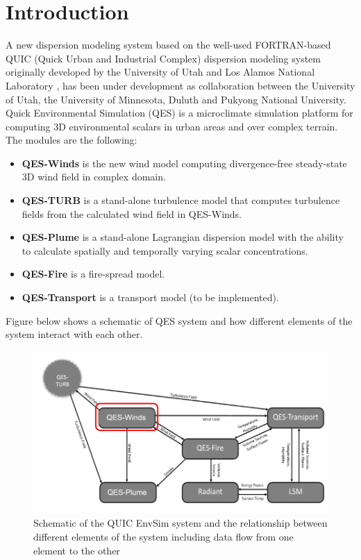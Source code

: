 \section{Introduction}

A new dispersion modeling system based on the well-used FORTRAN-based QUIC (Quick Urban and Industrial Complex) dispersion modeling system originally developed by the University of Utah and Los Alamos National Laboratory \cite{brown2013quic}, has been under development as collaboration between the University of Utah, the University of Minnesota, Duluth and Pukyong National University. Quick Environmental Simulation (QES) is a microclimate simulation platform for computing 3D environmental scalars in urban areas and over complex terrain.
The modules are the following:
\begin{itemize}
\item \textbf{QES-Winds} is the new wind model computing divergence-free steady-state 3D wind field in complex domain.
\item \textbf{QES-TURB} is a stand-alone turbulence model that computes turbulence fields from the calculated wind field in QES-Winds.
\item \textbf{QES-Plume} is a stand-alone Lagrangian dispersion model with the ability to calculate spatially and temporally varying scalar concentrations.
\item \textbf{QES-Fire} is a fire-spread model.
\item \textbf{QES-Transport} is a transport model (to be implemented).
\end{itemize}
Figure below shows a schematic of QES system and how different elements of the system interact with each other.

\begin{figure}[h!]
\includegraphics[width=16cm]{Images/QES_chart.png}
\centering
\caption{Schematic of the QUIC EnvSim system and the relationship between different elements of the system including data flow from one element to the other}
\end{figure}

